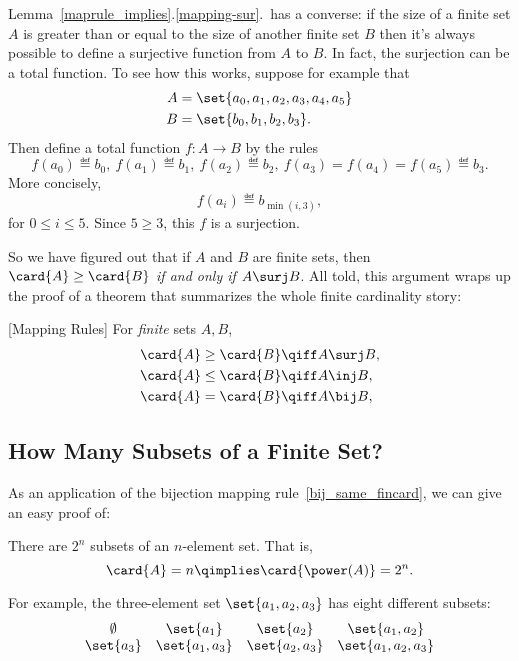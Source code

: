 Lemma~\ref{maprule_implies}.\ref{mapping-sur}.\ has a converse: if the
size of a finite set $A$ is greater than or equal to the size of
another finite set $B$ then it's always possible to define a
surjective function from $A$ to $B$.  In fact, the surjection can be a
total function.  To see how this works, suppose for example that
\begin{align*}
A & =\set{a_0,a_1,a_2,a_3,a_4,a_5}\\ B & =\set{b_0,b_1,b_2,b_3}.
\end{align*}
Then define a total function $f:A\to B$ by the rules
\[
f(a_0) \eqdef b_0,\ f(a_1) \eqdef b_1,\ f(a_2) \eqdef b_2,\ f(a_3)=
f(a_4)=f(a_5) \eqdef b_3.
\]
More concisely,
\[
f(a_i) \eqdef b_{\min(i,3)},
\]
for $0 \le i \le 5$.  Since $5 \geq 3$, this $f$ is a surjection.
\iffalse In fact, if $A$ and $B$ are finite sets of the same size,
then we could also define a bijection from $A$ to $B$ by this method.
\fi 

So we have figured out that if $A$ and $B$ are finite sets, then
$\card{A} \geq \card{B}$ \emph{if and only if} $A \surj B$.  All told,
this argument wraps up the proof of a theorem that summarizes the
whole finite cardinality story:
\begin{theorem}\label{maprul_thm}
[Mapping Rules] \mbox{} For \emph{finite} sets $A,B$,
\begin{align}
\card{A} \geq \card{B} & \qiff A \surj B,\label{sur_ge_fincard}\\
\card{A} \leq \card{B} & \qiff A \inj B,\label{inj_le_fincard}\\
\card{A} = \card{B} & \qiff A \bij B,\label{bij_same_fincard}
\end{align}
\end{theorem}%
%

\subsection{How Many Subsets of a Finite Set?}
As an application of the bijection mapping%
rule~\eqref{bij_same_fincard}, we can give an easy proof of:
\begin{theorem}\label{powset_fincard}
There are $2^n$ subsets of an $n$-element set.  That is,
\[
\card{A} = n \qimplies \card{\power(A)} = 2^n.
\]
\end{theorem}

For example, the three-element set $\set{a_1, a_2, a_3}$ has eight
different subsets: %
\[
\begin{array}{cccc}
\emptyset & \set{a_1} & \set{a_2} & \set{a_1, a_2} \\ \set{a_3} &
\set{a_1, a_3} & \set{a_2, a_3} & \set{a_1, a_2, a_3}
\end{array}
\]

